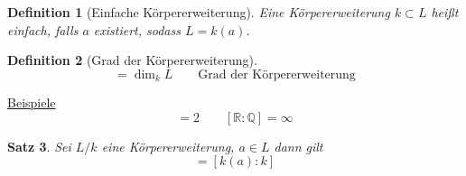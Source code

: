 \documentclass[a4paper,12pt,numbers=noenddot,parskip=full]{scrartcl}
\newcommand{\setQ}{\mathbb{Q}}
\newcommand{\setR}{\mathbb{R}}
\newcommand{\setC}{\mathbb{C}}
\newcommand{\heading}{\underline}
\theoremstyle{dotless}
\newtheorem{theorem}{Satz}[section]
\newtheorem{definition}[theorem]{Definition}
\theoremstyle{remark}
\begin{document}
	\begin{definition}[Einfache Körpererweiterung]
		Eine Körpererweiterung $k \subset L$ heißt einfach, falls $a$ existiert, sodass $L = k(a)$.
	\end{definition}

	\begin{definition}[Grad der Körpererweiterung]
		\begin{equation*}
			[L:k] = \dim_k L \qquad \text{Grad der Körpererweiterung}
		\end{equation*}
	\end{definition}

	\heading{Beispiele}
	\begin{equation*}
		[\setC : \setR] = 2 \qquad [\setR: \setQ]  = \infty
	\end{equation*}
	
	\begin{theorem}
		Sei $L/k$ eine Körpererweiterung, $a \in L$ dann gilt
		\begin{equation*}
			[a: k] = [k(a): k]
 		\end{equation*}
	\end{theorem}
\end{document}
